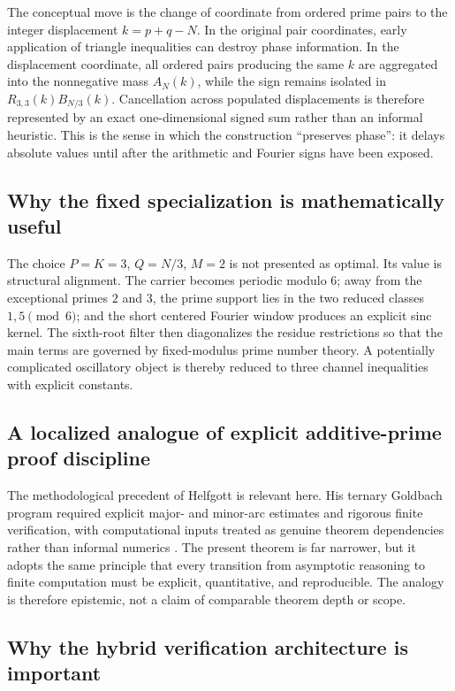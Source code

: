 \documentclass[11pt]{article}
\theoremstyle{definition}
\begin{document}
The conceptual move is the change of coordinate from ordered prime pairs to the integer displacement $k=p+q-N$. In the original pair coordinates, early application of triangle inequalities can destroy phase information. In the displacement coordinate, all ordered pairs producing the same $k$ are aggregated into the nonnegative mass $A_N(k)$, while the sign remains isolated in $R_{3,3}(k)B_{N/3}(k)$. Cancellation across populated displacements is therefore represented by an exact one-dimensional signed sum rather than an informal heuristic. This is the sense in which the construction ``preserves phase'': it delays absolute values until after the arithmetic and Fourier signs have been exposed.

\subsection{Why the fixed specialization is mathematically useful}

The choice $P=K=3$, $Q=N/3$, $M=2$ is not presented as optimal. Its value is structural alignment. The carrier becomes periodic modulo $6$; away from the exceptional primes $2$ and $3$, the prime support lies in the two reduced classes $1,5\pmod6$; and the short centered Fourier window produces an explicit sinc kernel. The sixth-root filter then diagonalizes the residue restrictions so that the main terms are governed by fixed-modulus prime number theory. A potentially complicated oscillatory object is thereby reduced to three channel inequalities with explicit constants.

\subsection{A localized analogue of explicit additive-prime proof discipline}

The methodological precedent of Helfgott is relevant here. His ternary Goldbach program required explicit major- and minor-arc estimates and rigorous finite verification, with computational inputs treated as genuine theorem dependencies rather than informal numerics \cite{HelfgottMajor2013,HelfgottPlatt2013,Helfgott2015}. The present theorem is far narrower, but it adopts the same principle that every transition from asymptotic reasoning to finite computation must be explicit, quantitative, and reproducible. The analogy is therefore epistemic, not a claim of comparable theorem depth or scope.

\subsection{Why the hybrid verification architecture is important}
\end{document}

